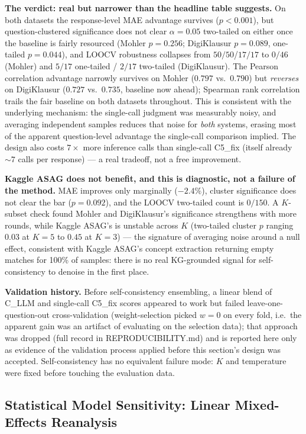 \documentclass[conference]{IEEEtran}
\begin{document}
\textbf{The verdict: real but narrower than the headline table
suggests.} On both datasets the response-level MAE advantage survives
($p<0.001$), but question-clustered significance does not clear
$\alpha=0.05$ two-tailed on either once the baseline is fairly
resourced (Mohler $p=0.256$; DigiKlausur $p=0.089$, one-tailed
$p=0.044$), and LOOCV robustness collapses from $50/50$/$17/17$ to
$0/46$ (Mohler) and $5/17$ one-tailed / $2/17$ two-tailed (DigiKlausur).
The Pearson correlation advantage narrowly survives on Mohler ($0.797$
vs.\ $0.790$) but \emph{reverses} on DigiKlausur ($0.727$ vs.\ $0.735$,
baseline now ahead); Spearman rank correlation trails the fair baseline
on both datasets throughout. This is consistent with the underlying
mechanism: the single-call judgment was measurably noisy, and averaging
independent samples reduces that noise for \emph{both} systems, erasing
most of the apparent question-level advantage the single-call
comparison implied. The design also costs $7\times$ more inference
calls than single-call C5\_fix (itself already $\sim7$ calls per
response) --- a real tradeoff, not a free improvement.

\textbf{Kaggle ASAG does not benefit, and this is diagnostic, not a
failure of the method.} MAE improves only marginally ($-2.4\%$), cluster
significance does not clear the bar ($p=0.092$), and the LOOCV
two-tailed count is $0/150$. A $K$-subset check found Mohler and
DigiKlausur's significance strengthens with more rounds, while Kaggle
ASAG's is unstable across $K$ (two-tailed cluster $p$ ranging $0.03$ at
$K{=}5$ to $0.45$ at $K{=}3$) --- the signature of averaging noise
around a null effect, consistent with Kaggle ASAG's concept extraction
returning empty matches for 100\% of samples: there is no real
KG-grounded signal for self-consistency to denoise in the first place.

\textbf{Validation history.} Before self-consistency ensembling, a
linear blend of C\_LLM and single-call C5\_fix scores appeared to work
but failed leave-one-question-out cross-validation (weight-selection
picked $w=0$ on every fold, i.e.\ the apparent gain was an artifact of
evaluating on the selection data); that approach was dropped (full
record in REPRODUCIBILITY.md) and is reported here only as evidence
of the validation process applied before this section's design was
accepted. Self-consistency has no equivalent failure mode: $K$ and
temperature were fixed before touching the evaluation data.

\subsection{Statistical Model Sensitivity: Linear Mixed-Effects Reanalysis}
\label{subsec:lmm}
\end{document}
